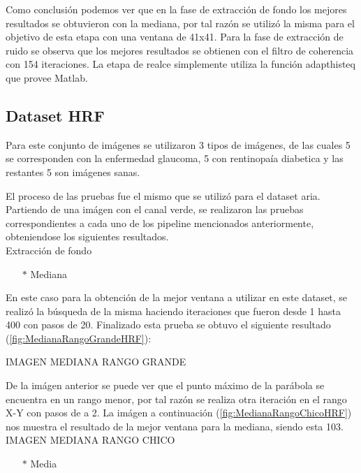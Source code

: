 Como conclusi\'on podemos ver que en la fase de extracci\'on de fondo los mejores resultados se obtuvieron con la mediana, por tal raz\'on se utiliz\'o la misma para el objetivo de esta etapa con una ventana de 41x41. Para la fase de extracci\'on de ruido se observa que los mejores resultados se obtienen con el filtro de coherencia con 154 iteraciones. La etapa de realce simplemente utiliza la funci\'on adapthisteq que provee Matlab.\\




\subsection{Dataset HRF}

Para este conjunto de im\'agenes se utilizaron 3 tipos de im\'agenes, de las cuales 5 se corresponden con la enfermedad glaucoma, 5 con rentinopa\'ia diabetica y las restantes 5 son im\'agenes sanas. 

El proceso de las pruebas fue el mismo que se utiliz\'o para el dataset aria. Partiendo de una im\'agen con el canal verde, se realizaron las pruebas correspondientes a cada uno de los pipeline mencionados anteriormente, obteniendose los siguientes resultados.\\

Extracción de fondo
\begin{itemize}
	\item[$*$]Mediana 
\end{itemize}

En este caso para la obtenci\'on de la mejor ventana a utilizar en este dataset, se realiz\'o la b\'usqueda de la misma haciendo iteraciones que fueron desde 1 hasta 400 con pasos de 20. Finalizado esta prueba se obtuvo el siguiente resultado (\ref{fig:MedianaRangoGrandeHRF}): 

IMAGEN MEDIANA RANGO GRANDE

De la im\'agen anterior se puede ver que el punto m\'aximo de la par\'abola se encuentra en un rango menor, por tal raz\'on se realiza otra iteraci\'on en el rango X-Y con pasos de a 2. La im\'agen a continuaci\'on (\ref{fig:MedianaRangoChicoHRF}) nos muestra el resultado de la mejor ventana para la mediana, siendo esta 103.\\

IMAGEN MEDIANA RANGO CHICO

\begin{itemize}
	\item[$*$]Media
\end{itemize}

